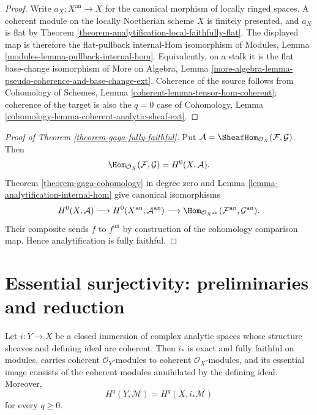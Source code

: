 \begin{proof}
Write $a_X:X^{\mathrm{an}}\to X$ for the canonical morphism of locally
ringed spaces. A coherent module on the locally Noetherian scheme $X$ is
finitely presented, and $a_X$ is flat by Theorem
\ref{theorem-analytification-local-faithfully-flat}. The displayed map is
therefore the flat-pullback internal-Hom isomorphism of Modules, Lemma
\ref{modules-lemma-pullback-internal-hom}. Equivalently, on a stalk it is
the flat base-change isomorphism of More on Algebra, Lemma
\ref{more-algebra-lemma-pseudo-coherence-and-base-change-ext}. Coherence of
the source follows from Cohomology of Schemes, Lemma
\ref{coherent-lemma-tensor-hom-coherent}; coherence of the target is also the
$q=0$ case of Cohomology, Lemma
\ref{cohomology-lemma-coherent-analytic-sheaf-ext}.
\end{proof}

\begin{proof}[Proof of Theorem \ref{theorem-gaga-fully-faithful}]
Put $\mathcal A=\SheafHom_{\mathcal O_X}(\mathcal F,\mathcal G)$. Then
$$
\Hom_{\mathcal O_X}(\mathcal F,\mathcal G)
=H^0(X,\mathcal A).
$$
Theorem \ref{theorem-gaga-cohomology} in degree zero and Lemma
\ref{lemma-analytification-internal-hom} give canonical isomorphisms
$$
H^0(X,\mathcal A)
\longrightarrow H^0(X^{\mathrm{an}},\mathcal A^{\mathrm{an}})
\longrightarrow
\Hom_{\mathcal O_{X^{\mathrm{an}}}}
(\mathcal F^{\mathrm{an}},\mathcal G^{\mathrm{an}}).
$$
Their composite sends $f$ to $f^{\mathrm{an}}$ by construction of the
cohomology comparison map. Hence analytification is fully faithful.
\end{proof}

\section{Essential surjectivity: preliminaries and reduction}
\label{section-gaga-essential-surjectivity-preliminaries}

\begin{lemma}
\label{lemma-coherent-analytic-closed-immersion}
Let $i:Y\to X$ be a closed immersion of complex analytic spaces whose
structure sheaves and defining ideal are coherent. Then $i_*$ is exact and
fully faithful on modules, carries coherent $\mathcal O_Y$-modules to
coherent $\mathcal O_X$-modules, and its essential image consists of the
coherent modules annihilated by the defining ideal. Moreover,
$$
H^q(Y,\mathcal M)=H^q(X,i_*\mathcal M)
$$
for every $q\geq0$.
\end{lemma}

